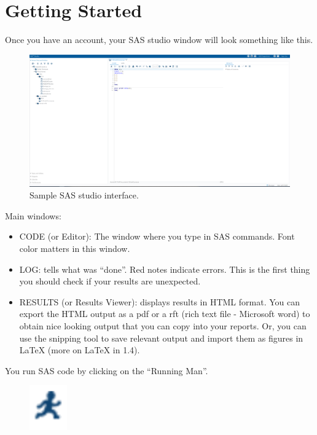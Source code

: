 \documentclass[12pt]{notes}
\begin{document}
\section{Getting Started}
Once you have an account, your SAS studio window will look something like this. 
\begin{figure}[H]
\includegraphics[width = \textwidth]{figures/module1/SASstudio.png}
\caption{Sample SAS studio interface.}
\end{figure}

\nspace
Main windows:
\begin{itemize}
\item CODE (or Editor): The window where you type in SAS commands. Font color matters in this window. 
\item LOG: tells what was ``done''. Red notes indicate errors. This is the first thing you should check if your results are unexpected. 
\item RESULTS (or Results Viewer): displays results in HTML format. You can export the HTML output as a pdf or a rft (rich text file - Microsoft word) to obtain nice looking output that you can copy into your reports. Or, you can use the snipping tool to save relevant output and import them as figures in LaTeX (more on LaTeX in 1.4). 
\end{itemize}


You run SAS code by clicking on the ``Running Man''. 


\begin{figure}[H]
\centering
\includegraphics{figures/module1/runningman.png}
\end{figure}
\end{document}
